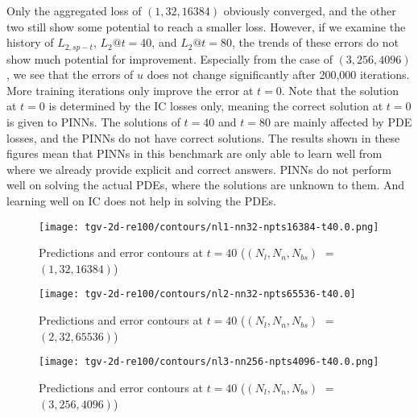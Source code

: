 Only the aggregated loss of $(1, 32, 16384)$ obviously converged, and the other two still show some potential to reach a smaller loss.
However, if we examine the history of $L_{2,sp-t}$, $L_2@t=40$, and $L_2@t=80$, the trends of these errors do not show much potential for improvement.
Especially from the case of $(3, 256, 4096)$, we see that the errors of $u$ does not change significantly after 200,000 iterations.
More training iterations only improve the error at $t=0$.
Note that the solution at $t=0$ is determined by the IC losses only, meaning the correct solution at $t=0$ is given to PINNs.
The solutions of $t=40$ and $t=80$ are mainly affected by PDE losses, and the PINNs do not have correct solutions.
The results shown in these figures mean that PINNs in this benchmark are only able to learn well from where we already provide explicit and correct answers.
PINNs do not perform well on solving the actual PDEs, where the solutions are unknown to them.
And learning well on IC does not help in solving the PDEs.

\begin{figure}[hbt!]
    \centering%
    \texttt{[image: tgv-2d-re100/contours/nl1-nn32-npts16384-t40.0.png]}
    \caption[%
        Predictions and error contours at $t=40$ for $(N_l, N_n, N_{bs})=(1, 32, 16384)$%
    ]{%
        Predictions and error contours at $t=40$ ($(N_l, N_n, N_{bs})$ $=$ $(1, 32, 16384)$)%
    }
    \label{fig:nl1-nn32-npts16384-t40-contours}
\end{figure}

\begin{figure}[hbt!]
    \centering%
    \texttt{[image: tgv-2d-re100/contours/nl2-nn32-npts65536-t40.0]}
    \caption[%
        Predictions and error contours at $t=40$ for $(N_l, N_n, N_{bs})=(2, 32, 65536)$%
    ]{%
        Predictions and error contours at $t=40$ ($(N_l, N_n, N_{bs})$ $=$ $(2, 32, 65536)$)%
    }
    \label{fig:nl2-nn32-npts65536-t40-contours}
\end{figure}

\begin{figure}[hbt!]
    \centering%
    \texttt{[image: tgv-2d-re100/contours/nl3-nn256-npts4096-t40.0.png]}
    \caption[%
        Predictions and error contours at $t=40$ for $(N_l, N_n, N_{bs})=(3, 256, 4096)$%
    ]{%
        Predictions and error contours at $t=40$ ($(N_l, N_n, N_{bs})$ $=$ $(3, 256, 4096)$)%
    }
    \label{fig:nl3-nn256-npts4096-t40-contours}
\end{figure}

